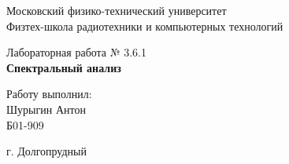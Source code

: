 
\begin{titlepage}
	\begin{center}
		\large 	Московский физико-технический университет \\
		Физтех-школа радиотехники и компьютерных технологий\\
		\vspace{0.2cm}
		
		\vspace{4.5cm}
		Лабораторная работа № 3.6.1 \\ \vspace{0.2cm}
		\LARGE \textbf{Спектральный анализ}
	\end{center}
	\vspace{2.3cm} \large
	
	\begin{center}
		Работу выполнил: \\
		Шурыгин Антон \\
		Б01-909

	\end{center}
	
	\begin{center} \vspace{60mm}
		г. Долгопрудный \\
	\end{center}
\end{titlepage}
